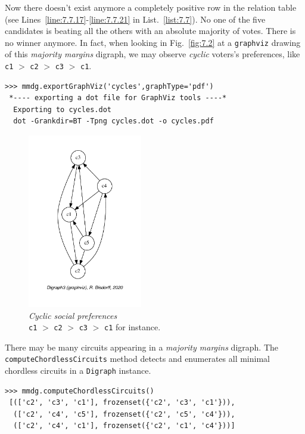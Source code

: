 Now there doesn't exist anymore a completely positive row in the relation table (see Lines~\ref{line:7.7.17}-\ref{line:7.7.21} in List.~\ref{list:7.7}). No one of the five candidates is beating all the others with an absolute majority of votes. There is no \Condorcet winner anymore. In fact, when looking in Fig.~\vref{fig:7.2} at a \texttt{graphviz} drawing of this \emph{majority margins} digraph, we may observe \emph{cyclic} voters's preferences, like \texttt{c1} $>$ \texttt{c2} $>$ \texttt{c3} $>$ \texttt{c1}.
\begin{lstlisting}
>>> mmdg.exportGraphViz('cycles',graphType='pdf')
 *---- exporting a dot file for GraphViz tools ----*
  Exporting to cycles.dot
  dot -Grankdir=BT -Tpng cycles.dot -o cycles.pdf
\end{lstlisting}
\begin{figure}[ht]
\sidecaption[t]
\includegraphics[width=5cm]{Figures/7-2-cycles.pdf}
\caption[Cyclic social preferences]{\emph{Cyclic social preferences}\\ \texttt{c1} $>$ \texttt{c2} $>$ \texttt{c3} $>$ \texttt{c1} for instance.}
\label{fig:7.2}       %
\end{figure}
	   
There may be many circuits appearing in a \emph{majority margins} digraph. The \texttt{computeChordlessCircuits} method detects and enumerates all minimal chordless circuits in a \texttt{Digraph} instance. 
\begin{lstlisting}
>>> mmdg.computeChordlessCircuits()
 [(['c2', 'c3', 'c1'], frozenset({'c2', 'c3', 'c1'})), 
  (['c2', 'c4', 'c5'], frozenset({'c2', 'c5', 'c4'})), 
  (['c2', 'c4', 'c1'], frozenset({'c2', 'c1', 'c4'}))]
\end{lstlisting}

